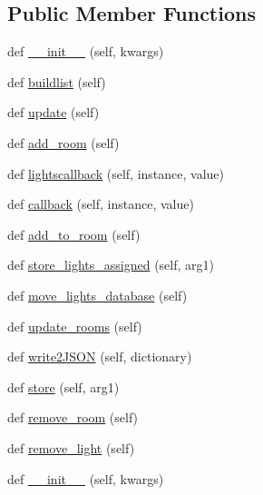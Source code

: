 \subsection*{Public Member Functions}
\begin{DoxyCompactItemize}
\item 
def \hyperlink{classTestingGUI_1_1LightsView_ae63565dfb2328abb68fa8751284425a9}{\+\_\+\+\_\+init\+\_\+\+\_\+} (self, kwargs)
\item 
def \hyperlink{classTestingGUI_1_1LightsView_ad567fc119c87bdf050d2d105cffb102e}{buildlist} (self)
\item 
def \hyperlink{classTestingGUI_1_1LightsView_ae28189742abd26346c227385fe8866c7}{update} (self)
\item 
def \hyperlink{classTestingGUI_1_1LightsView_ab04e59790bba8440f9f1d65e84bc8ae6}{add\+\_\+room} (self)
\item 
def \hyperlink{classTestingGUI_1_1LightsView_abc44bd1d87c0d060890ad095b6195d27}{lightscallback} (self, instance, value)
\item 
def \hyperlink{classTestingGUI_1_1LightsView_a6868b6f77d43e03f6568b62169c9b19c}{callback} (self, instance, value)
\item 
def \hyperlink{classTestingGUI_1_1LightsView_a38460cbc7553198ef9a613d09919e077}{add\+\_\+to\+\_\+room} (self)
\item 
def \hyperlink{classTestingGUI_1_1LightsView_a3ff5b4674219060370bd91c84e99513c}{store\+\_\+lights\+\_\+assigned} (self, arg1)
\item 
def \hyperlink{classTestingGUI_1_1LightsView_ad2a97175fc114e694c6fe598361c6334}{move\+\_\+lights\+\_\+database} (self)
\item 
def \hyperlink{classTestingGUI_1_1LightsView_add6c257a4625658791c08aca275dbe4d}{update\+\_\+rooms} (self)
\item 
def \hyperlink{classTestingGUI_1_1LightsView_a363b48af2153effb586500f5ca0f371d}{write2\+J\+S\+ON} (self, dictionary)
\item 
def \hyperlink{classTestingGUI_1_1LightsView_a956aabd6c68ac0028a5dbc46ae9475ad}{store} (self, arg1)
\item 
def \hyperlink{classTestingGUI_1_1LightsView_a5f41c66493303b7174b335356d4deee5}{remove\+\_\+room} (self)
\item 
def \hyperlink{classTestingGUI_1_1LightsView_aa302b8817251a5f3c0f2c0d153073399}{remove\+\_\+light} (self)
\item 
def \hyperlink{classTestingGUI_1_1LightsView_ae63565dfb2328abb68fa8751284425a9}{\+\_\+\+\_\+init\+\_\+\+\_\+} (self, kwargs)

\end{DoxyCompactItemize}
